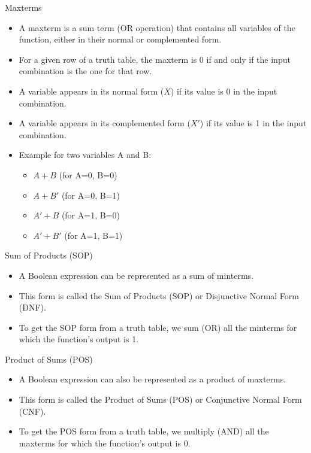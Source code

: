 \documentclass{beamer}
\begin{document}
\begin{frame}{Maxterms}
    \begin{itemize}
        \item A maxterm is a sum term (OR operation) that contains all variables of the function, either in their normal or complemented form.
        \item For a given row of a truth table, the maxterm is 0 if and only if the input combination is the one for that row.
        \item A variable appears in its normal form ($X$) if its value is 0 in the input combination.
        \item A variable appears in its complemented form ($X'$) if its value is 1 in the input combination.
        \item Example for two variables A and B:
            \begin{itemize}
                \item $A+B$ (for A=0, B=0)
                \item $A+B'$ (for A=0, B=1)
                \item $A'+B$ (for A=1, B=0)
                \item $A'+B'$ (for A=1, B=1)
            \end{itemize}
    \end{itemize}
\end{frame}

\begin{frame}{Sum of Products (SOP)}
    \begin{itemize}
        \item A Boolean expression can be represented as a sum of minterms.
        \item This form is called the Sum of Products (SOP) or Disjunctive Normal Form (DNF).
        \item To get the SOP form from a truth table, we sum (OR) all the minterms for which the function's output is 1.
    \end{itemize}
\end{frame}

\begin{frame}{Product of Sums (POS)}
    \begin{itemize}
        \item A Boolean expression can also be represented as a product of maxterms.
        \item This form is called the Product of Sums (POS) or Conjunctive Normal Form (CNF).
        \item To get the POS form from a truth table, we multiply (AND) all the maxterms for which the function's output is 0.
    \end{itemize}
\end{frame}
\end{document}
